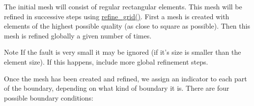 The initial mesh will consist of regular rectangular elements. This mesh will be refined in successive steps using \hyperlink{classvsf_1_1ApShear_ae0c1413d01e98526e4a61a7324bf2ae0}{refine\-\_\-grid()}. First a mesh is created with elements of the highest possible quality (as close to square as possible). Then this mesh is refined globally a given number of times.

\begin{DoxyNote}{Note}
If the fault is very small it may be ignored (if it's size is smaller than the element size). If this happens, include more global refinement steps. 
\end{DoxyNote}
Once the mesh has been created and refined, we assign an indicator to each part of the boundary, depending on what kind of boundary it is. There are four possible boundary conditions\-:


